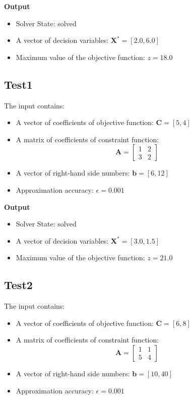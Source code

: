 \documentclass[12pt, legalpaper]{exam}
\begin{document}
\noindent  \textbf{Output}
\begin{itemize}
    \item Solver State: solved
    \item A vector of decision variables: $\mathbf{X^*} = [2.0, 6.0]$
    \item Maximum value of the objective function: $z = 18.0$
\end{itemize}

\vspace{1cm}

\subsection*{Test1}
The input contains:
\begin{itemize}
    \item A vector of coefficients of objective function: $\mathbf{C} = [5, 4]$
    \item A matrix of coefficients of constraint function:
    \[
    \mathbf{A} =
    \begin{bmatrix}
    1 & 2 \\
    3 & 2
    \end{bmatrix}
    \]
    \item A vector of right-hand side numbers: $\mathbf{b} = [6, 12]$
    \item Approximation accuracy: $\epsilon = 0.001$
\end{itemize}

\noindent  \textbf{Output}
\begin{itemize}
    \item Solver State: solved
    \item A vector of decision variables: $\mathbf{X^*} = [3.0, 1.5]$
    \item Maximum value of the objective function: $z = 21.0$
\end{itemize}

\vspace{1cm}

\subsection*{Test2}
The input contains:
\begin{itemize}
    \item A vector of coefficients of objective function: $\mathbf{C} = [6, 8]$
    \item A matrix of coefficients of constraint function:
    \[
    \mathbf{A} =
    \begin{bmatrix}
    1 & 1 \\
    5 & 4
    \end{bmatrix}
    \]
    \item A vector of right-hand side numbers: $\mathbf{b} = [10, 40]$
    \item Approximation accuracy: $\epsilon = 0.001$
\end{itemize}
\end{document}
